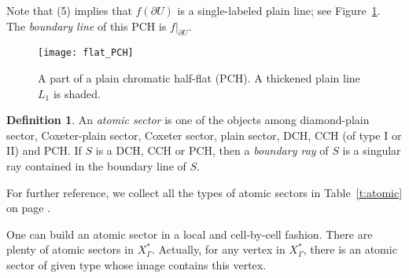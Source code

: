\documentclass[11pt]{amsart}
\theoremstyle{definition}
\newtheorem{definition}[theorem]{Definition}
\newcommand{\Xa}{X^{\ast}}
\begin{document}
Note that (5) implies that $f(\partial U)$ is a single-labeled plain line; see Figure~\ref{f:flat_PCH}. The \emph{boundary line} of this PCH is $f|_{\partial U}$.

\begin{figure}[h!]
	\centering
	\texttt{[image: flat\_PCH]}
	\caption{A part of a plain chromatic half-flat (PCH). A thickened plain line $L_1$ is shaded.}
	\label{f:flat_PCH}
\end{figure}


\begin{definition}
\label{d:atomic}
An \emph{atomic sector} is one of the objects among diamond-plain sector, Coxeter-plain sector, Coxeter sector, plain sector, DCH, CCH (of type I or II) and PCH. If $S$ is a DCH, CCH or PCH, then a \emph{boundary ray} of $S$ is a singular ray contained in the boundary line of $S$.
\end{definition}

For further reference, we collect all the types of atomic sectors in Table~\ref{t:atomic} on page \pageref{t:atomic}.


One can build an atomic sector in a local and cell-by-cell fashion. There are plenty of atomic sectors in $\Xa_\Gamma$. Actually, for any vertex in $\Xa_\Gamma$, there is an atomic sector of given type whose image contains this vertex. 
\end{document}
